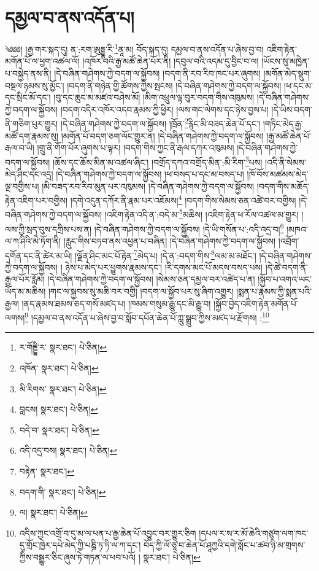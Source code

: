 \setcounter{footnote}{0} 
\chapter{དམྱལ་བ་ནས་འདོན་པ།}༄༅༅། །རྒྱ་གར་སྐད་དུ། ན་:རག་ཨུདྡྷ་རི་\footnote{ར་གོདྡྷི་ར་  སྣར་ཐང་།  པེ་ཅིན། }ནཱ་མ། བོད་སྐད་དུ། དམྱལ་བ་ནས་འདོན་པ་ཞེས་བྱ་བ། འཇིག་རྟེན་མགོན་པོ་ལ་ཕྱག་འཚལ་ལོ། །འཁོར་བའི་རྒྱ་མཚོ་ཆེན་པོར་ནི། །དབུལ་བའི་འདམ་དུ་བྱིང་བ་ལ། །ཡོངས་སུ་མཁྱེན་པ་བསྐྱེད་ནས་ནི། །དེ་བཞིན་གཤེགས་ཀྱེ་བདག་ལ་སྐྱོབས། །བདག་ནི་རབ་རིབ་ཁང་པར་ཞུགས། །མགོན་མེད་སྡུག་བསྔལ་ཉམས་སུ་མྱོང་། །བདག་ནི་གཉེན་གྱི་ཚོགས་ཀྱིས་སྤངས། །དེ་བཞིན་གཤེགས་ཀྱེ་བདག་ལ་སྐྱོབས། །ཕ་དང་མ་དང་སྲིང་མོ་དང་། །བུ་དང་ཆུང་མ་མཛའ་བཤེས་མོ། །མིག་འཕྲུལ་ལྟ་བུར་བདག་གིས་འཁུམས། །དེ་བཞིན་གཤེགས་ཀྱེ་བདག་ལ་སྐྱོབས། །བདག་འདིར་འཁོར་འདབ་རྣམས་ཀྱི་ཕྱིར། །ལས་གང་ལེགས་དང་ཉེས་བྱས་པ། །དེ་ཡིས་བདག་ནི་གཅིག་པུར་གྱུར། །དེ་བཞིན་གཤེགས་ཀྱེ་བདག་ལ་སྐྱོབས། །ཁྲོན་\footnote{འཁོན་  སྣར་ཐང་།  པེ་ཅིན། }རྙིང་མི་བཟད་ཆེན་པོ་དང་། །གཏིང་མེད་རྒྱ་མཚོ་དག་རྣམས་སུ། །མགོན་པོ་བདག་ཅག་ལོང་གྱུར་ན། །དེ་བཞིན་གཤེགས་ཀྱེ་བདག་ལ་སྐྱོབས། །རྒྱ་མཚོ་ཆེན་པོ་རྒལ་བ་ཡི། །གྲུ་ནི་གོག་པོར་ཞུགས་པ་ལྟར། །བདག་གིས་ཀྱང་ནི་རྒལ་དཀར་འཁུམས། །དེ་བཞིན་གཤེགས་ཀྱེ་བདག་ལ་སྐྱོབས། །ཆོས་དང་ཆོས་མིན་མ་འཚལ་ཞིང་། །བགྲོད་དཀའ་བགྲོད་མིན་:མི་རིག་\footnote{མི་རིགས་  སྣར་ཐང་།  པེ་ཅིན། }པས། །འདི་ནི་སེམས་མེད་ཤིང་དང་འདྲ། །དེ་བཞིན་གཤེགས་ཀྱེ་བདག་ལ་སྐྱོབས། །ཕ་བསད་པ་དང་མ་བསད་པ། །ཁོ་བོས་མཚམས་མེད་ལྔ་བགྱིས་པ། །མི་བཟད་རབ་རིབ་མུན་པར་འཁུམས། །དེ་བཞིན་གཤེགས་ཀྱེ་བདག་ལ་སྐྱོབས། །བདག་གིས་མཆོད་རྟེན་འཇིག་པར་བགྱིས། །དགེ་འདུན་དཀོར་ནི་རྣམ་པར་འཇོམས།\footnote{བླངས།  སྣར་ཐང་།  པེ་ཅིན། } །བདག་གིས་སེམས་ཅན་འཚེ་བར་བགྱིས། །དེ་བཞིན་གཤེགས་ཀྱེ་བདག་ལ་སྐྱོབས། །འཇིག་རྟེན་འདི་ན་:བདེ་མ་\footnote{བདེ་བ་  སྣར་ཐང་།  པེ་ཅིན། }མཆིས། །འཇིག་རྟེན་ཕ་རོལ་འཚལ་མ་གྱུར། །ལས་ཀྱི་སྲད་བུས་དཀྲིས་པས་ན། །དེ་བཞིན་གཤེགས་ཀྱེ་བདག་ལ་སྐྱོབས། །དེ་ཡི་གསོན་པ་:འདི་འདྲ་བ།\footnote{འདི་འདྲ་བས།  སྣར་ཐང་།  པེ་ཅིན། } །མཁའ་ལ་ཀ་ཤིའི་མེ་ཏོག་ནི། །རླུང་གིས་བཏབ་ནས་འཕྱན་པ་བཞིན། །དེ་བཞིན་གཤེགས་ཀྱེ་བདག་ལ་སྐྱོབས། །འབྲོག་དགོན་དང་ནི་ཚེར་མ་ཡི། །ལྗོན་ཤིང་མང་པོ་རྟེན་\footnote{བརྟེན་  སྣར་ཐང་། }མེད་པ། །དེ་ན་:བདག་གིས་\footnote{བདག་གི་  སྣར་ཐང་།  པེ་ཅིན། }ལམ་མ་མཐོང་། །དེ་བཞིན་གཤེགས་ཀྱེ་བདག་ལ་སྐྱོབས། །
ཉེས་པ་མེད་པར་ཕྱུགས་རྣམས་དང་། །རི་དགས་མང་པོ་མདས་བསད་པས། །དེ་ཚེ་བདག་ནི་རྒྱལ་པོར་རློམ། །དེ་བཞིན་གཤེགས་ཀྱེ་བདག་ལ་སྐྱོབས། །སེམས་ཅན་དམྱལ་བར་འཚེད་པ་ན། །སྐྱོབ་པ་འགའ་ཡང་ཡོད་མ་མཆིས། །གང་ལ་སྐྱབས་སུ་མཆི་བར་བགྱི། །བདག་ལ་སྐྱོབ་པར་སུ་ཞིག་འགྱུར། །སྨན་པ་རྣམས་ཀྱི་སྨན་པའི་རྒྱལ། །ནད་རྣམས་ཐམས་ཅད་གསོ་མཛད་པ། །ཁམས་གསུམ་རྒྱུ་དང་མི་རྒྱུ་བ། །སྐྱོབ་བྱེད་འཇིག་རྟེན་མགོན་པོ་ལགས།\footnote{ལ།  སྣར་ཐང་།  པེ་ཅིན། } །དམྱལ་བ་ནས་འདོན་པ་ཞེས་བྱ་བ་སློབ་དཔོན་ཆེན་པོ་ཀླུ་སྒྲུབ་ཀྱིས་མཛད་པ་རྫོགས། :\footnote{འདིས་ཀྱང་འགྲོ་བ་དུ་མ་ལ་ཕན་པ་རྒྱ་ཆེན་པོ་འབྱུང་བར་གྱུར་ཅིག །དཔལ་ར་ས་ར་མོ་ཆེའི་གཙུག་ལག་ཁང་དུ་གྲོང་ཁྱེར་དཔེ་མེད་ཀྱི་པཎྜི་ཏ་ཏི་ལ་ཀ་དང་། བོད་ཀྱི་ལོ་ཙཱ་བ་ཆེན་པོ་ཤཱཀྱའི་དགེ་སློང་པ་ཚབ་ཉི་མ་གྲགས་ཀྱིས་བསྒྱུར་ཅིང་ཞུས་ཏེ་གཏན་ལ་ཕབ་པའོ། །  སྣར་ཐང་།  པེ་ཅིན། }